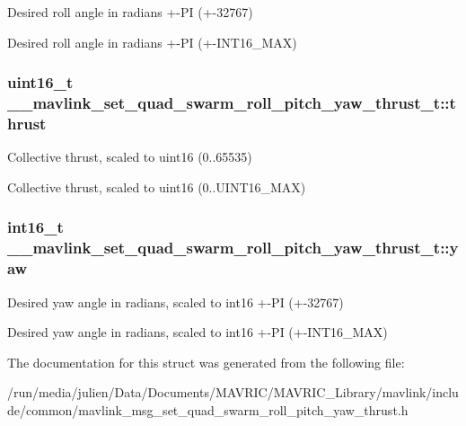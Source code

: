Desired roll angle in radians +-\/\+P\+I (+-\/32767) 

Desired roll angle in radians +-\/\+P\+I (+-\/\+I\+N\+T16\+\_\+\+M\+A\+X) \hypertarget{struct____mavlink__set__quad__swarm__roll__pitch__yaw__thrust__t_a085e7ec86e906997e9e2953eab4713e8}{
\subsubsection[{thrust}]{\setlength{\rightskip}{0pt plus 5cm}uint16\+\_\+t \+\_\+\+\_\+mavlink\+\_\+set\+\_\+quad\+\_\+swarm\+\_\+roll\+\_\+pitch\+\_\+yaw\+\_\+thrust\+\_\+t\+::thrust}}\label{struct____mavlink__set__quad__swarm__roll__pitch__yaw__thrust__t_a085e7ec86e906997e9e2953eab4713e8}


Collective thrust, scaled to uint16 (0..65535) 

Collective thrust, scaled to uint16 (0..U\+I\+N\+T16\+\_\+\+M\+A\+X) \hypertarget{struct____mavlink__set__quad__swarm__roll__pitch__yaw__thrust__t_af2117d5ce6d9f7651924cb3091279121}{
\subsubsection[{yaw}]{\setlength{\rightskip}{0pt plus 5cm}int16\+\_\+t \+\_\+\+\_\+mavlink\+\_\+set\+\_\+quad\+\_\+swarm\+\_\+roll\+\_\+pitch\+\_\+yaw\+\_\+thrust\+\_\+t\+::yaw}}\label{struct____mavlink__set__quad__swarm__roll__pitch__yaw__thrust__t_af2117d5ce6d9f7651924cb3091279121}


Desired yaw angle in radians, scaled to int16 +-\/\+P\+I (+-\/32767) 

Desired yaw angle in radians, scaled to int16 +-\/\+P\+I (+-\/\+I\+N\+T16\+\_\+\+M\+A\+X) 

The documentation for this struct was generated from the following file\+:\begin{DoxyCompactItemize}
\item 
/run/media/julien/\+Data/\+Documents/\+M\+A\+V\+R\+I\+C/\+M\+A\+V\+R\+I\+C\+\_\+\+Library/mavlink/include/common/mavlink\+\_\+msg\+\_\+set\+\_\+quad\+\_\+swarm\+\_\+roll\+\_\+pitch\+\_\+yaw\+\_\+thrust.\+h\end{DoxyCompactItemize}
